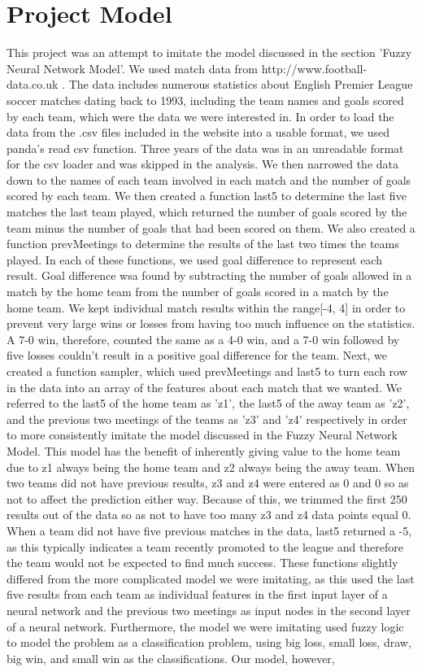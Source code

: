 \documentclass[sigconf]{acmart}
\begin{document}
\section{Project Model}
This project was an attempt to imitate the model discussed in the section 'Fuzzy Neural Network Model'. We used match data from http://www.football-data.co.uk \cite{SoccerData}. The data includes numerous statistics about English Premier League soccer matches dating back to 1993, including the team names and goals scored by each team, which were the data we were interested in. In order to load the data from the .csv files included in the website into a usable format, we used panda's read csv function. Three years of the data was in an unreadable format for the csv loader and was skipped in the analysis. We then narrowed the data down to the names of each team involved in each match and the number of goals scored by each team. We then created a function last5 to determine the last five matches the last team played, which returned the number of goals scored by the team minus the number of goals that had been scored on them. We also created a function prevMeetings to determine the results of the last two times the teams played. In each of these functions, we used goal difference to represent each result. Goal difference wsa found by subtracting the number of goals allowed in a match by the home team from the number of goals scored in a match by the home team. We kept individual match results within the range[-4, 4] in order to prevent very large wins or losses from having too much influence on the statistics. A 7-0 win, therefore, counted the same as a 4-0 win, and a 7-0 win followed by five losses couldn't result in a positive goal difference for the team. Next, we created a function sampler, which used prevMeetings and last5 to turn each row in the data into an array of the features about each match that we wanted. We referred to the last5 of the home team as 'z1', the last5 of the away team as 'z2', and the previous two meetings of the teams as 'z3' and 'z4' respectively in order to more consistently imitate the model discussed in the Fuzzy Neural Network Model. This model has the benefit of inherently giving value to the home team due to z1 always being the home team and z2 always being the away team. When two teams did not have previous results, z3 and z4 were entered as 0 and 0 so as not to affect the prediction either way. Because of this, we trimmed the first 250 results out of the data so as not to have too many z3 and z4 data points equal 0. When a team did not have five previous matches in the data, last5 returned a -5, as this typically indicates a team recently promoted to the league and therefore the team would not be expected to find much success. These functions slightly differed from the more complicated model we were imitating, as this used the last five results from each team as individual features in the first input layer of a neural network and the previous two meetings as input nodes in the second layer of a neural network. Furthermore, the model we were imitating used fuzzy logic to model the problem as a classification problem, using big loss, small loss, draw, big win, and small win as the classifications. Our model, however, 
\end{document}
